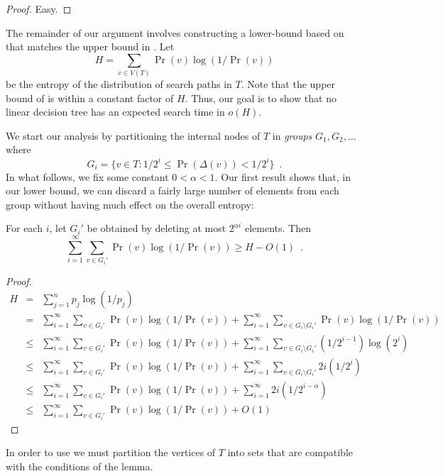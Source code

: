 \documentclass[charterfonts,lotsofwhite]{patmorin}
\begin{document}
\begin{proof}
Easy.
\end{proof}

The remainder of our argument involves constructing a lower-bound
based on  that matches the upper bound in
.  Let 
\[
   H = \sum_{v\in V(T)} \Pr(v)\log (1/\Pr(v))
\] 
be the entropy of the distribution of search paths in $T$.  Note that
the upper bound of  is within a constant factor of
$H$. Thus, our goal is to show that no linear decision tree has an
expected search time in $o(H)$.

We start our analysis by partitioning the internal nodes of $T$ in
\emph{groups} $G_1,G_2,\ldots$ where
\[
	G_i = \{v\in T : 1/2^{i} \le \Pr(\Delta(v)) < 1/2^i \} \enspace .
\]
In what follows, we fix some constant $0< \alpha < 1$.  Our first
result shows that, in our lower bound, we can discard a fairly large
number of elements from each group without having much effect on the
overall entropy:

\begin{lem}
For each $i$, let $G_i'$ be obtained by deleting at most $2^{\alpha
i}$ elements.  Then
\[
    \sum_{i=1}^\infty \sum_{v\in G_i'} \Pr(v)\log(1/\Pr(v)) \ge H-O(1)
	\enspace .
\]
\end{lem}

\begin{proof}
\begin{eqnarray*}
   H & = & \sum_{j=1}^n p_j\log(1/p_j) \\
   & = & \sum_{i=1}^{\infty}\sum_{v\in G_i'} \Pr(v)\log (1/\Pr(v)) +
         \sum_{i=1}^{\infty}\sum_{v\in G_i\setminus G_i'} \Pr(v)\log (1/\Pr(v)) \\
   & \le & \sum_{i=1}^{\infty}\sum_{v\in G_i'} \Pr(v)\log (1/\Pr(v)) +
         \sum_{i=1}^{\infty}\sum_{v\in G_i\setminus G_i'} (1/2^{i-1})\log (2^i) \\
   & \le & \sum_{i=1}^{\infty}\sum_{v\in G_i'} \Pr(v)\log (1/\Pr(v)) +
         \sum_{i=1}^{\infty}\sum_{v\in G_i\setminus G_i'} 2i(1/2^{i}) \\
   & \le & \sum_{i=1}^{\infty}\sum_{v\in G_i'} \Pr(v)\log (1/\Pr(v)) +
         \sum_{i=1}^{\infty} 2i(1/2^{i-\alpha}) \\
   & \le & \sum_{i=1}^{\infty}\sum_{v\in G_i'} \Pr(v)\log (1/\Pr(v)) + O(1)
\end{eqnarray*}
\end{proof}

In order to use  we must partition the vertices of
$T$ into sets that are compatible with the conditions of the lemma.
\end{document}
